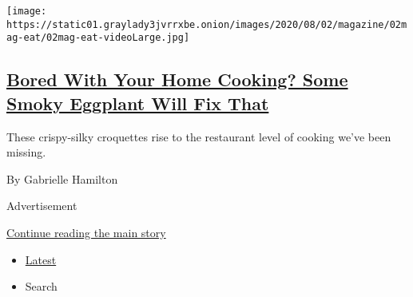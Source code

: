 \begin{enumerate}
  \texttt{[image: https://static01.graylady3jvrrxbe.onion/images/2020/08/02/magazine/02mag-eat/02mag-eat-videoLarge.jpg]}

  \hypertarget{bored-with-your-home-cooking-some-smoky-eggplant-will-fix-that}{%
  \subsection{\texorpdfstring{\href{/2020/07/29/magazine/bored-with-your-home-cooking-some-smoky-eggplant-will-fix-that.html}{Bored
  With Your Home Cooking? Some Smoky Eggplant Will Fix
  That}}{Bored With Your Home Cooking? Some Smoky Eggplant Will Fix That}}\label{bored-with-your-home-cooking-some-smoky-eggplant-will-fix-that}}

  These crispy-silky croquettes rise to the restaurant level of cooking
  we've been missing.

  By Gabrielle Hamilton
\end{enumerate}

Advertisement

\protect\hyperlink{after-mid1}{Continue reading the main story}

\begin{itemize}
\tightlist
\item
  \protect\hyperlink{stream-panel}{Latest}
\item
  Search
\end{itemize}

